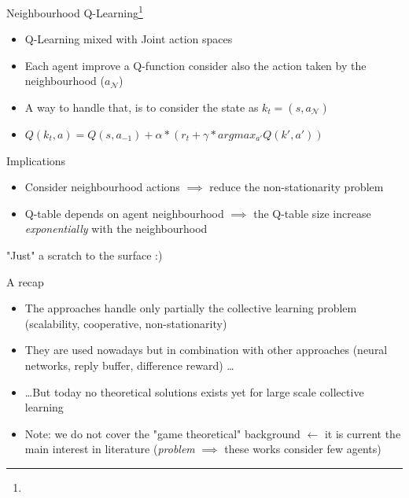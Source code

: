 \documentclass[presentation]{beamer}\mode<presentation>{\usetheme{AMSBolognaFC}}
\begin{document}
\begin{frame}{Neighbourhood Q-Learning\footnote{}}
	\begin{exampleblock}{}
		\begin{itemize}
			\item Q-Learning mixed with Joint action spaces
			\item Each agent improve a Q-function consider also the action taken by the neighbourhood ($a_{\mathcal{N}}$)
			\item A way to handle that, is to consider the state as $k_t = (s, a_{\mathcal{N}})$
			\item $Q(k_t, a) = Q(s, a_{-1}) + \alpha * (r_t + \gamma * argmax_{a'}Q(k', a'))$
		\end{itemize}
	\end{exampleblock}

	\begin{exampleblock}{Implications}
		\begin{itemize}
			\item[{\color{teal}\faThumbsUp}] Consider neighbourhood actions $\implies$ reduce the non-stationarity problem 
			\item[{\color{red}\faThumbsDown}] Q-table depends on agent neighbourhood $\implies$ the Q-table size increase \emph{exponentially} with the neighbourhood
		\end{itemize}
	\end{exampleblock}
\end{frame}
\begin{frame}{"Just" a scratch to the surface :)}
	\begin{exampleblock}{A recap}
		\begin{itemize}
			\item The approaches handle only partially the collective learning problem (scalability, cooperative, non-stationarity)
			\item They are used nowadays but in combination with other approaches (neural networks, reply buffer, difference reward) \dots
			\item \dots But today no theoretical solutions exists yet for large scale collective learning
			\item Note: we do not cover the "game theoretical" background $\leftarrow$ it is current the main interest in literature (\emph{problem} $\implies$ these works consider few agents)
		\end{itemize}
	\end{exampleblock}
\end{frame}
\end{document}

